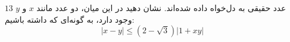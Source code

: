 \EXERCISE
$13$
عدد حقیقی به دل‌خواه داده شده‌اند. نشان دهید در این میان، دو عدد مانند
$x$
و
$y$
وجود دارد، به گونه‌ای که داشته باشیم:
$$|x - y| \leq (2 - \sqrt{3})|1 + xy|$$